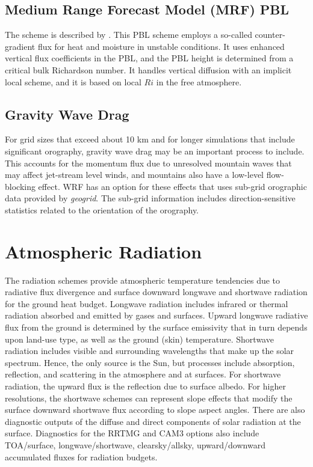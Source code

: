\subsection {Medium Range Forecast Model (MRF) PBL}

The scheme is described by \citet{hong96}. 
This PBL scheme employs a so-called counter-gradient flux for heat and moisture 
in unstable conditions. It uses enhanced vertical flux coefficients in the PBL, 
and the PBL height is determined from a critical bulk Richardson number. 
It handles vertical diffusion with an implicit local scheme, and it is based 
on local $Ri$ in the free atmosphere.

\subsection {Gravity Wave Drag}

For grid sizes that exceed about 10 km and for longer simulations that include significant orography,
gravity wave drag may be an important process to include. This accounts for the momentum flux
due to unresolved mountain waves that may affect jet-stream level winds, and mountains also
have a low-level flow-blocking effect. WRF has an option for these effects \citep{choi15} that uses
sub-grid orographic data provided by {\em geogrid}. The sub-grid information includes direction-sensitive
statistics related to the orientation of the orography.


\section{Atmospheric Radiation}

The radiation schemes provide atmospheric temperature tendencies due to radiative 
flux divergence and surface downward longwave and shortwave 
radiation for the ground heat budget. Longwave radiation includes 
infrared or thermal radiation absorbed and emitted by gases and surfaces. 
Upward longwave radiative flux from the ground is determined by the surface 
emissivity that in turn depends upon land-use type, as well as the ground (skin) 
temperature. Shortwave radiation includes visible and surrounding wavelengths 
that make up the solar spectrum. Hence, the only source is the Sun, but 
processes include absorption, reflection, and scattering in the atmosphere 
and at surfaces. For shortwave radiation, the upward flux is the reflection due to surface 
albedo. For higher resolutions, the shortwave schemes can represent slope effects
that modify the surface downward shortwave flux according to slope aspect angles.
There are also diagnostic outputs of the diffuse and direct components of solar radiation
at the surface. Diagnostics for the RRTMG and CAM3 options also include
TOA/surface, longwave/shortwave, clearsky/allsky, upward/downward  accumulated
fluxes for radiation budgets.

